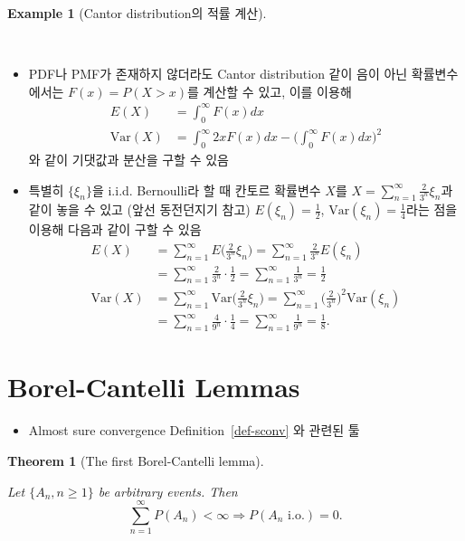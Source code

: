 \documentclass[
  13pt,
  letterpaper,
  DIV=11,
  numbers=noendperiod]{scrreprt}
\providecommand{\tightlist}{%
  \setlength{\itemsep}{0pt}\setlength{\parskip}{0pt}}\usepackage{longtable,booktabs,array}
\theoremstyle{plain}
\theoremstyle{definition}
\newtheorem{example}{Example}[chapter]
\theoremstyle{definition}
\theoremstyle{plain}
\theoremstyle{definition}
\theoremstyle{plain}
\newtheorem{theorem}{Theorem}[chapter]
\theoremstyle{remark}
\begin{document}
\begin{example}[Cantor distribution의 적률
계산]\protect\hypertarget{exm-cantorexp}{}\label{exm-cantorexp}

~

\begin{itemize}
\item
  PDF나 PMF가 존재하지 않더라도 Cantor distribution 같이 음이 아닌
  확률변수에서는 \(F(x) = P(X>x)\)를 계산할 수 있고, 이를 이용해 \[
  \begin{align*}
  E(X) &= \int_0^{\infty} F(x) dx\\
  \text{Var} (X) &= \int_0^{\infty} 2x F(x) dx - \Big( \int_0^{\infty}F(x) dx \Big)^2
  \end{align*}
  \] 와 같이 기댓값과 분산을 구할 수 있음
\item
  특별히 \(\{\xi_n\}\)을 i.i.d. Bernoulli라 할 때 칸토르 확률변수
  \(X\)를 \(X=\sum_{n=1}^{\infty}\frac{2}{3^n}\xi_n\)과 같이 놓을 수
  있고 (앞선 동전던지기 참고) \(E(\xi_n)=\frac{1}{2}\),
  \(\text{Var}(\xi_n) = \frac{1}{4}\)라는 점을 이용해 다음과 같이 구할
  수 있음 \[
  \begin{align*}
  E(X) &= \sum_{n=1}^{\infty} E\Big( \frac{2}{3^n} \xi_n \Big)= \sum_{n=1}^{\infty}  \frac{2}{3^n} E(\xi_n)\\&= \sum_{n=1}^{\infty} \frac{2}{3^n }\cdot \frac{1}{2}= \sum_{n=1}^{\infty} \frac{1}{3^n} = \frac{1}{2}\\
  \text{Var}(X) &= \sum_{n=1}^{\infty} \text{Var}\Big( \frac{2}{3^n} \xi_n \Big)= \sum_{n=1}^{\infty}  \Big(\frac{2}{3^n}\Big)^2 \text{Var}(\xi_n)\\&= \sum_{n=1}^{\infty} \frac{4}{9^n }\cdot \frac{1}{4}= \sum_{n=1}^{\infty} \frac{1}{9^n} = \frac{1}{8}.
  \end{align*}
  \]
\end{itemize}

\end{example}

\section{Borel-Cantelli Lemmas}\label{borel-cantelli-lemmas}

\begin{itemize}
\tightlist
\item
  Almost sure convergence Definition~\ref{def-sconv} 와 관련된 툴
\end{itemize}

\begin{theorem}[The first Borel-Cantelli
lemma]\protect\hypertarget{thm-firstborelcantelli}{}\label{thm-firstborelcantelli}

Let \(\{A_n, n \geq 1\}\) be arbitrary events. Then \[
\sum_{n=1}^{\infty}P(A_n) < \infty \Longrightarrow P(A_n \text{ i.o.})=0.
\]

\end{theorem}
\end{document}
